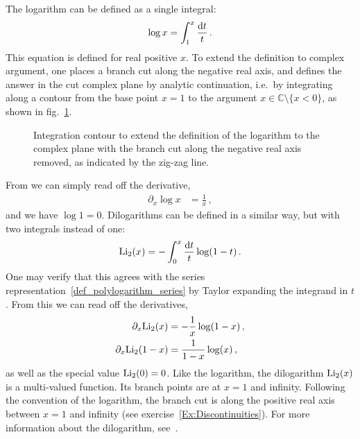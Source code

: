 The logarithm can be defined as a single integral: 
\begin{align}\label{eq:logxreal}
\log x = \int_{1}^{x} \frac{\mathrm{d} t}{t} \,.
\end{align}
This equation is defined for real positive $x$. 
To extend the definition to complex argument, one places a branch cut along the negative real axis, and defines the answer in the cut complex plane by analytic continuation, i.e.\ by integrating along a contour from the base point $x=1$ to the argument $x \in \mathbb{C} \setminus \{x<0\}$, as shown in fig.~\ref{fig:logarithm}.

\begin{figure}[t]
\centering
{}
   \caption{Integration contour to extend the definition of the logarithm to the complex plane with the branch cut along the negative real axis removed, as indicated by the zig-zag line.}
  \label{fig:logarithm}
\end{figure}

From  we can simply read off the derivative,
\begin{align}\label{eq:difflog}
\partial_x \log x &= \frac{1}{x} \,,
\end{align}
and we have $\log 1 = 0$.
Dilogarithms can be defined in a similar way, but with two integrals instead of one:
\begin{align} \label{eq:Li2_integral}
{\rm Li}_{2}(x) = - \int_{0}^{x} \frac{\mathrm{d} t}{t} \log(1-t) \,.
\end{align}
One may verify that this agrees with the series representation~\eqref{def_polylogarithm_series} by Taylor expanding the integrand in $t$.
From this we can read off the derivatives,
\begin{align}
\partial_x {\rm Li}_{2}(x) &= -\frac{1}{x} \log(1-x) \,,\\
\partial_x {\rm Li}_{2}(1-x) &= \frac{1}{1-x} \log(x)  \label{diffeqLi2}  \,,
\end{align}
as well as the special value  ${\rm Li}_{2}(0) = 0$. Like the logarithm, the dilogarithm ${\rm Li}_2(x)$ is a multi-valued function. Its branch points are at $x=1$ and infinity. Following the convention of the logarithm, the branch cut is along the positive real axis between $x=1$ and infinity (see exercise~\ref{Ex:Discontinuities}).
For more information about the dilogarithm, see~\cite{ch4Zagier:2007knq}.


